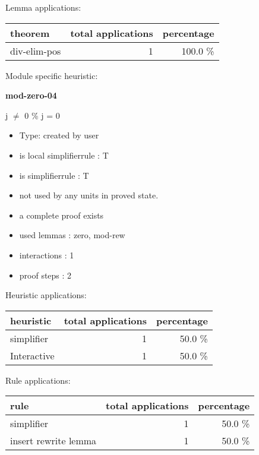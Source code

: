 \documentclass[a4paper]{article}
\begin{document}
Lemma applications:

\begin{supertabular}{l|r|r}
theorem	        & total applications & percentage \\ \hline
div-elim-pos & 1 & 100.0 \% \\

\end{supertabular}

Module specific heuristic:

\pagebreak

{\LARGE\bf mod-zero-04}\label{lemma-mod-zero-04}

\medskip

j $\neq$ 0  \% j = 0

\begin{itemize}

\item Type: created by user

\item is local simplifierrule : T
\item is simplifierrule : T
\item not used by any units in proved state.
\item       a complete proof exists
\item       used lemmas  : zero, mod-rew
\item       interactions : 1
\item       proof steps  : 2
\end{itemize}

\medskip


Heuristic applications:

\begin{supertabular}{l|r|r}
heuristic	& total applications & percentage \\ \hline
simplifier & 1 & 50.0 \% \\
Interactive & 1 & 50.0 \% \\

\end{supertabular}

Rule applications:

\begin{supertabular}{l|r|r}
rule	        & total applications & percentage \\ \hline
simplifier & 1 & 50.0 \% \\
insert rewrite lemma & 1 & 50.0 \% \\

\end{supertabular}
\end{document}
